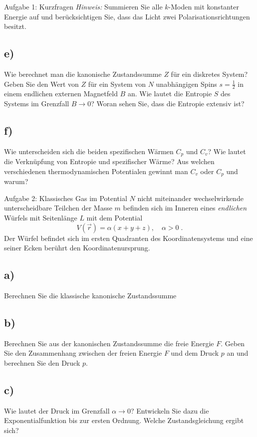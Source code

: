 \begin{aufgabe}{Aufgabe 1: Kurzfragen}
    \textit{Hinweis:} Summieren Sie alle $k$-Moden mit konstanter Energie auf und berücksichtigen Sie,
    dass das Licht zwei Polarisationsrichtungen besitzt.

    \subsection{e)}
    Wie berechnet man die kanonische Zustandssumme $Z$ für ein diskretes System?
    Geben Sie den Wert von $Z$ für ein System von $N$ unabhängigen Spins $s = \frac{1}{2}$ in einem endlichen externen Magnetfeld $B$ an.
    Wie lautet die Entropie $S$ des Systems im Grenzfall $B \to 0$?
    Woran sehen Sie, dass die Entropie extensiv ist?

    \subsection{f)}
    Wie unterscheiden sich die beiden spezifischen Wärmen $C_p$ und $C_v$?
    Wie lautet die Verknüpfung von Entropie und spezifischer Wärme?
    Aus welchen verschiedenen thermodynamischen Potentialen gewinnt man $C_v$ oder $C_p$ und warum?
\end{aufgabe}

\begin{aufgabe}{Aufgabe 2: Klassisches Gas im Potential}
    $N$ nicht miteinander wechselwirkende unterscheidbare Teilchen der Masse $m$ befinden sich im Inneren eines \textit{endlichen} Würfels mit Seitenlänge $L$ mit dem Potential
    \[
        V(\vec r) = \alpha(x + y + z), \quad \alpha > 0 \;.
    \]
    Der Würfel befindet sich im ersten Quadranten des Koordinatensystems und eine seiner Ecken berührt den Koordinatenursprung.

    \subsection{a)}
    Berechnen Sie die klassische kanonische Zustandssumme

    \subsection{b)}
    Berechnen Sie aus der kanonischen Zustandssumme die freie Energie $F$.
    Geben Sie den Zusammenhang zwischen der freien Energie $F$ und dem Druck $p$ an und berechnen Sie den Druck $p$.

    \subsection{c)}
    Wie lautet der Druck im Grenzfall $\alpha \to 0$?
    Entwickeln Sie dazu die Exponentialfunktion bis zur ersten Ordnung.
    Welche Zustandsgleichung ergibt sich?
\end{aufgabe}


